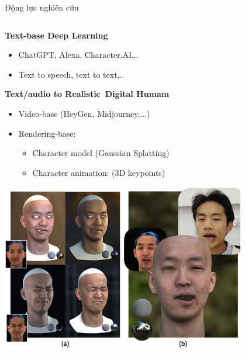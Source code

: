 \documentclass[10pt,mathserif]{beamer}
\begin{document}
\begin{frame}{Động lực nghiên cứu}
	\vspace{5pt}
	
	\begin{columns}
	\begin{column}{0.7\textwidth}
		\textbf{Text-base Deep Learning}
		\begin{itemize}
			\item ChatGPT, Alexa, Character.AI,..
			\item Text to speech, text to text,..
		\end{itemize}
		
		\textbf{Text/audio to Realistic Digital Humam}
		
		\begin{itemize}
			\item Video-base (HeyGen, Midjourney,...)
			\item Rendering-base:
			\begin{itemize}
				\item Character model (Gaussian Splatting)
				\item Character animation: (3D keypoints)
			\end{itemize}
		\end{itemize}
		\vspace{5pt}
		\centering
		\includegraphics[width=0.8\textwidth]{FacialAsset.png}
	\end{column}
	

\end{columns}
\end{frame}
\end{document}
